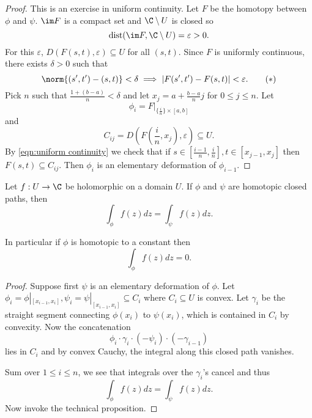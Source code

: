\documentclass[a4paper]{article}
\begin{document}
\begin{proof}
  This is an exercise in uniform continuity. Let \(F\) be the homotopy between \(\phi\) and \(\psi\). \(\im F\) is a compact set and \(\C \setminus U\) is closed so
  \[
    \operatorname{dist}(\im F, \C \setminus U) = \varepsilon > 0.
  \]
  For this \(\varepsilon\), \(D(F(s, t), \varepsilon) \subseteq U\) for all \((s, t)\). Since \(F\) is uniformly continuous, there exists \(\delta > 0\) such that
  \begin{equation}
    \label{eqn:uniform continuity}
    \norm{(s', t') - (s, t)} < \delta \implies |F(s', t') - F(s, t)| < \varepsilon.
    \tag{\(\ast\)}
  \end{equation}
  Pick \(n\) such that \(\frac{1 + (b - a)}{n} < \delta\) and let \(x_j = a + \frac{b - a}{n}j\) for \(0 \leq j \leq n\). Let
  \[
    \phi_i = F|_{\{\frac{i}{n}\} \times [a, b]}
  \]
  and
  \[
    C_{ij} = D(F(\frac{i}{n}, x_j), \varepsilon) \subseteq U.
  \]
  By \eqref{eqn:uniform continuity} we check that if \(s \in [\frac{i - 1}{n}, \frac{i}{n}], t \in [x_{j - 1}, x_j]\) then \(F(s, t) \subseteq C_{ij}\). Then \(\phi_i\) is an elementary deformation of \(\phi_{i - 1}\).
\end{proof}

\begin{theorem}
  \label{thm:homotopic Cauchy}
  Let \(f: U \to \C\) be holomorphic on a domain \(U\). If \(\phi\) and \(\psi\) are homotopic closed paths, then
  \[
    \int_\phi f(z) dz = \int_\psi f(z) dz.
  \]

  In particular if \(\phi\) is homotopic to a constant then
  \[
    \int_\phi f(z) dz = 0.
  \]
\end{theorem}

\begin{proof}
  Suppose first \(\psi\) is an elementary deformation of \(\phi\). Let \(\phi_i = \phi|_{[x_{i - 1}, x_i]}, \psi_i = \psi|_{[x_{i - 1}, x_i]} \subseteq C_i\) where \(C_i \subseteq U\) is convex. Let \(\gamma_i\) be the straight segment connecting \(\phi(x_i)\) to \(\psi(x_i)\), which is contained in \(C_i\) by convexity. Now the concatenation
  \[
    \phi_i \cdot \gamma_i \cdot (-\psi_i) \cdot (-\gamma_{i - 1})
  \]
  lies in \(C_i\) and by convex Cauchy, the integral along this closed path vanishes.

  Sum over \(1 \leq i \leq n\), we see that integrals over the \(\gamma_i\)'s cancel and thus
  \[
    \int_\phi f(z) dz = \int_\psi f(z) dz.
  \]
  Now invoke the technical proposition.
\end{proof}
\end{document}
